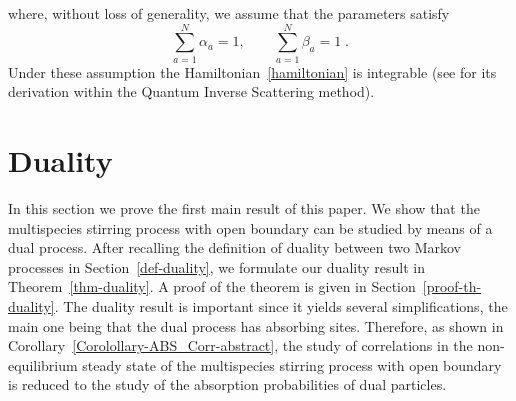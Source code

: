 \documentclass[10pt]{article}
\numberwithin{equation}{section}
\numberwithin{equation}{subsection}
\begin{document}
where, without loss of generality,  we assume that the parameters satisfy
\begin{equation}\label{ratesConditions}
	\sum_{a=1}^{N}\alpha_{a}=1,\qquad\sum_{a=1}^{N}\beta_{a}=1\;.
\end{equation} 
Under these assumption the Hamiltonian~\ref{hamiltonian} is integrable (see \cite{vanicat2017exact} for its derivation within the Quantum Inverse Scattering method). 


\section{Duality}\label{sectionDuality}
In this section we prove the first main result of this paper. We show that the multispecies stirring process with open boundary
can be studied by means of a dual process. After recalling the definition of duality between two
Markov processes in Section~\ref{def-duality}, we formulate our duality result  in Theorem~\ref{thm-duality}. A proof of the theorem is given in Section~\ref{proof-th-duality}.
The duality result is important since it yields several simplifications, the main one being that the
dual process has absorbing sites. Therefore, as shown in Corollary~\ref{Corolollary-ABS_Corr-abstract}, the study of correlations in the non-equilibrium steady state of the multispecies stirring process with open boundary
is reduced to the study of the absorption probabilities of dual particles.
\end{document}
